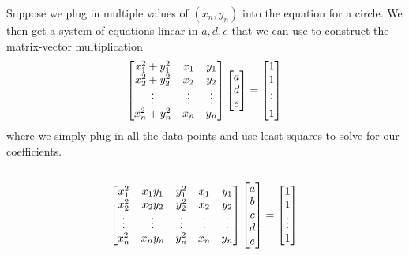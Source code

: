 \documentclass[]{article}
\begin{document}
Suppose we plug in multiple values of \((x_n, y_n)\) into the equation for a circle. 
We then get a system of equations linear in \(a, d, e\) that we can use to construct the matrix-vector multiplication
\begin{equation}
	\begin{bmatrix}
	x_1^2 + y_1^2 & x_1 & y_1 \\
	x_2^2 + y_2^2 & x_2 & y_2 \\
	\vdots & \vdots & \vdots \\
	x_n^2 + y_n^2 & x_n & y_n
	\end{bmatrix}
	\begin{bmatrix}
	a \\
	d \\
	e
	\end{bmatrix}
	=
	\begin{bmatrix}
	1 \\
	1 \\
	\vdots \\
	1
	\end{bmatrix} \\
\end{equation}
where we simply plug in all the data points and use least squares to solve for our coefficients. 

\subsection{}

\begin{equation}
		\begin{bmatrix}
	x_1^2 & x_1 y_1 & y_1^2 & x_1 & y_1 \\
	x_2^2 & x_2 y_2 & y_2^2 & x_2 & y_2 \\
	\vdots & \vdots & \vdots & \vdots & \vdots \\
	x_n^2 & x_n y_n & y_n^2 & x_n & y_n
	\end{bmatrix}
	\begin{bmatrix}
	a \\
	b \\
	c \\
	d \\
	e
	\end{bmatrix}
	=
	\begin{bmatrix}
	1 \\
	1 \\
	\vdots \\
	1
	\end{bmatrix} \\
\end{equation}
\end{document}
